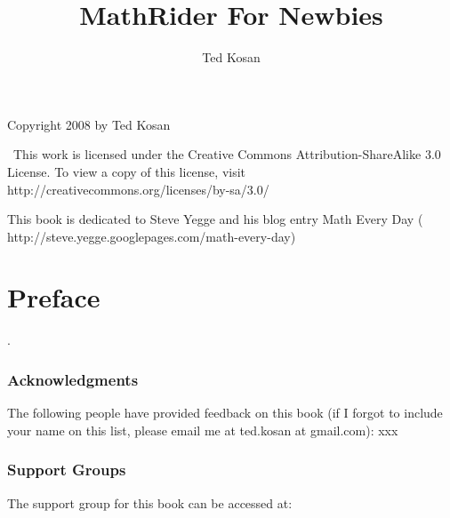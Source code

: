 \documentclass[12pt,twoside]{book}
\begin{document}
\frontmatter


\title{MathRider For Newbies}


\author{Ted Kosan}
\maketitle

\begin{center}
\begin{minipage}{3in}

\bigskip

{\centering
Copyright \textsf{{\textcopyright}} 2008 by Ted Kosan
\par}


\bigskip

\ This work is licensed under the Creative Commons
Attribution{}-ShareAlike 3.0 License. To view a copy of this license,
visit http://creativecommons.org/licenses/by{}-sa/3.0/
\end{minipage}
\end{center}




\linenumbers


This book is dedicated to Steve Yegge and his blog entry
{\textquotedbl}Math Every Day{\textquotedbl} (
http://steve.yegge.googlepages.com/math{}-every{}-day)


\renewcommand\contentsname{Table of Contents}
\tableofcontents

\bigskip



\chapter*{Preface}

.

\subsection{Acknowledgments}
The following people have provided feedback on this book (if I forgot to include your name on this list, please email me at ted.kosan at gmail.com):  xxx


\bigskip

\subsection[Support Groups]{Support Groups}
The support group for this book can be accessed at:
\end{document}
